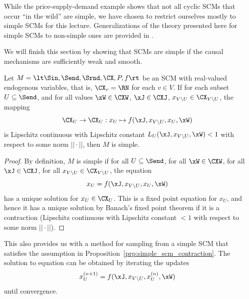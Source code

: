 While the price-supply-demand example shows that not all cyclic SCMs that occur ``in the wild'' are simple, we have chosen
to restrict ourselves mostly to simple SCMs for this lecture. Generalizations of the theory presented here for simple SCMs 
to non-simple ones are provided in \cite{BFPM21}.

We will finish this section by showing that SCMs are simple if the causal mechanisms are sufficiently weak and smooth.
\begin{Prp}\label{prp:simple_scm_contraction}
  Let $M = \lt \Sin, \Send, \Srnd, \CX, P, f \rt$ be an SCM with real-valued endogenous variables, that is, $\CX_v = \RN$ for each $v \in V$.
  If for each subset $U \subseteq \Send$, and for all values $\xW\in\CXW$, $\xJ \in \CXJ$, $x_{V\sm U} \in \CX_{V\sm U}$, the mapping
  \begin{equation*}
  \CX_U \to \CX_U : x_U \mapsto f(\xJ,x_{V\sm U},x_U,\xW)
  \end{equation*}
  is Lipschitz continuous with Lipschitz constant $L_U(\xJ,x_{V\sm U},\xW) < 1$ with respect to some norm $||\cdot||$, then $M$ is simple.
\end{Prp}
\begin{proof}
  By definition, $M$ is simple if for all $U \subseteq \Send$, for all $\xW\in\CXW$, for all $\xJ \in \CXJ$, for all $x_{V\sm U} \in \CX_{V\sm U}$, the equation
  \begin{equation}\label{eq:simple_scm_contraction}
    x_U = f(\xJ,x_{V\sm U},x_U,\xW)
  \end{equation}
  has a unique solution for $x_U\in\CX_U$.
  This is a fixed point equation for $x_U$, and hence it has a unique solution by Banach's fixed point theorem if it is a contraction (Lipschitz continuous with Lipschitz constant $<1$ with respect to some norm $||\cdot||$).
\end{proof}

\begin{Rem}
  This also provides us with a method for sampling from a simple SCM that satisfies the assumption in Proposition~\ref{prp:simple_scm_contraction}. The solution to equation  
can be obtained by iterating the updates
  $$x_U^{(n+1)} = f(\xJ,x_{V\sm U},x_U^{(n)},\xW)$$
until convergence.
\end{Rem}

